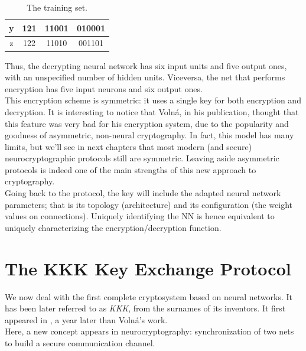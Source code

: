\documentclass[%
    corpo=11pt,
    twoside,
    stile=classica,
    oldstyle,
    autoretitolo,
    tipotesi=magistrale,
    greek,
    evenboxes,
    english
]{toptesi}
\begin{document}
\begin{table}[]
\begin{tabular}{|c|c|c|c|}
y             & 121                                                           & 11001                                                                        & 010001                                                                       \\ \hline
z             & 122                                                           & 11010                                                                        & 001101                                                                       \\ \hline
\end{tabular}
\caption{The training set.}
\label{table:traingset}
\end{table}
Thus, the decrypting neural network has six input units and five output ones, with an unspecified number of hidden units. Viceversa, the net that performs encryption has five input neurons and six output ones. \\
This encryption scheme is symmetric: it uses a single key for both encryption and decryption. It is interesting to notice that Volná, in his publication, thought that this feature was very bad for his encryption system, due to the popularity and goodness of asymmetric, non-neural cryptography. In fact, this model has many limits, but we'll see in next chapters that most modern (and secure) neurocryptographic protocols still are symmetric. Leaving aside asymmetric protocols is indeed one of the main strengths of this new approach to cryptography. \\
Going back to the protocol, the key will include the adapted neural network parameters; that is its topology (architecture) and its configuration (the weight values on connections). Uniquely identifying the NN is hence equivalent to uniquely characterizing the encryption/decryption function.

\newpage

\section{The KKK Key Exchange Protocol}
We now deal with the first complete cryptosystem based on neural networks. It has been later referred to as \textit{KKK}, from the surnames of its inventors. It first appeared in \cite{kanter}, a year later than Volná's work. \\
Here, a new concept appears in neurocryptography: synchronization of two nets to build a secure communication channel.
\end{document}
